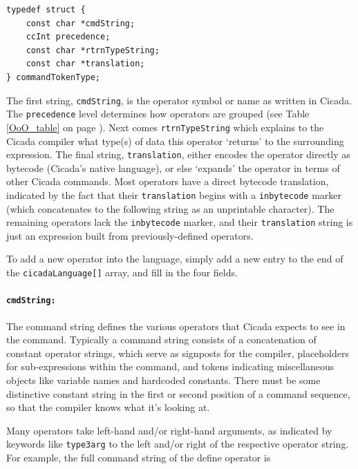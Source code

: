 \documentclass{article}
\newenvironment{code}{
       \begin{list}{}{
               \setlength{\leftmargin}{.4in}
               \setlength{\rightmargin}{0in}
               \setlength{\topsep}{.2in}
       }
       \small
       \item[] }
       { \end{list}   }
\begin{document}
\begin{code} \begin{verbatim}
typedef struct {
    const char *cmdString;
    ccInt precedence;
    const char *rtrnTypeString;
    const char *translation;
} commandTokenType;
\end{verbatim} \end{code}

\noindent The first string, \verb#cmdString#, is the operator symbol or name as written in Cicada.  The \verb#precedence# level determines how operators are grouped (see Table \ref{OoO_table} on page \pageref{OoO_table}).  Next comes \verb#rtrnTypeString# which explains to the Cicada compiler what type(s) of data this operator `returns' to the surrounding expression.  The final string, \verb#translation#, either encodes the operator directly as bytecode (Cicada's native language), or else `expands' the operator in terms of other Cicada commands.  Most operators have a direct bytecode translation, indicated by the fact that their \verb#translation# begins with a \verb#inbytecode# marker (which concatenates to the following string as an unprintable character).  The remaining operators lack the \verb#inbytecode# marker, and their \verb#translation# string is just an expression built from previously-defined operators.

To add a new operator into the language, simply add a new entry to the end of the \verb#cicadaLanguage[]# array, and fill in the four fields.



\paragraph{\texttt{cmdString:}}  The command string defines the various operators that Cicada expects to see in the command.  Typically a command string consists of a concatenation of constant operator strings, which serve as signposts for the compiler, placeholders for sub-expressions within the command, and tokens indicating miscellaneous objects like variable names and hardcoded constants.  There must be some distinctive constant string in the first or second position of a command sequence, so that the compiler knows what it's looking at.

Many operators take left-hand and/or right-hand arguments, as indicated by keywords like \verb#type3arg# to the left and/or right of the respective operator string.  For example, the full command string of the define operator is
\end{document}
